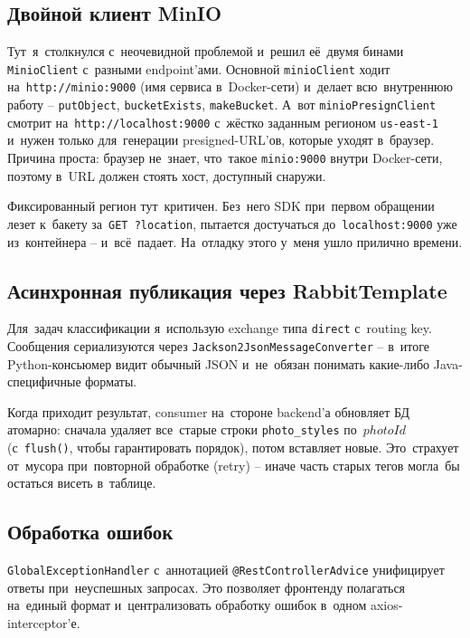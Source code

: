 \documentclass[a4paper,12pt]{diplom}
\begin{document}
\subsection{Двойной клиент MinIO}

Тут~я~столкнулся с~неочевидной проблемой и~решил её~двумя бинами \texttt{MinioClient} с~разными endpoint'ами. Основной \texttt{minioClient} ходит на~\verb|http://minio:9000| (имя сервиса в~Docker-сети) и~делает всю~внутреннюю работу -- \verb|putObject|, \verb|bucketExists|, \verb|makeBucket|. А~вот \texttt{minioPresignClient} смотрит на~\verb|http://localhost:9000| с~жёстко заданным регионом \verb|us-east-1| и~нужен только для~генерации presigned-URL'ов, которые уходят в~браузер. Причина проста: браузер не~знает, что~такое \verb|minio:9000| внутри Docker-сети, поэтому в~URL должен стоять хост, доступный снаружи.

Фиксированный регион тут~критичен. Без~него SDK при~первом обращении лезет к~бакету за~\verb|GET ?location|, пытается достучаться до~\verb|localhost:9000| уже из~контейнера -- и~всё~падает. На~отладку этого у~меня ушло прилично времени.

\subsection{Асинхронная публикация через RabbitTemplate}

Для~задач классификации я~использую exchange типа \verb|direct| с~routing key. Сообщения сериализуются через \texttt{Jackson2JsonMessageConverter} -- в~итоге Python-консьюмер видит обычный JSON и~не~обязан понимать какие-либо Java-специфичные форматы.

Когда приходит результат, consumer на~стороне backend'а обновляет БД атомарно: сначала удаляет все~старые строки \texttt{photo\_styles} по~$photoId$ (с~\verb|flush()|, чтобы гарантировать порядок), потом вставляет новые. Это~страхует от~мусора при~повторной обработке (retry) -- иначе часть старых тегов могла~бы остаться висеть в~таблице.

\subsection{Обработка ошибок}

\texttt{GlobalExceptionHandler} с~аннотацией \verb|@RestControllerAdvice| унифицирует ответы при~неуспешных запросах. Это позволяет фронтенду полагаться на~единый формат и~централизовать обработку ошибок в~одном axios-interceptor'е.
\end{document}
